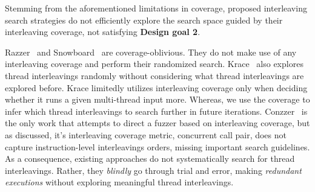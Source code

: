 







%
Stemming from the aforementioned limitations in coverage, 
proposed interleaving search strategies do not efficiently 
explore the search space guided by their interleaving coverage,
not satisfying \textbf{Design goal 2}.

Razzer~\cite{razzer} and Snowboard~\cite{snowboard} are coverage-oblivious.
They do not make use of any interleaving coverage 
and perform their randomized search. \dr{}
%
Krace~\cite{krace} also explores thread interleavings randomly without
considering what thread interleavings are explored before.  Krace
limitedly utilizes interleaving coverage only when deciding whether it
runs a given multi-thread input more. Whereas, we use the coverage to
infer which thread interleavings to search further in future
iterations.
%
Conzzer~\cite{conzzer} is the only work that attempts to direct a
fuzzer based on interleaving coverage, but as discussed,  
it's interleaving coverage metric, concurrent call pair, does not capture instruction-level interleavings orders, missing important 
search guidelines.
%
As a consequence, existing approaches do not systematically search for
thread interleavings.  Rather, they \textit{blindly} go through
trial and error, making \textit{redundant executions} without exploring
meaningful thread interleavings.

